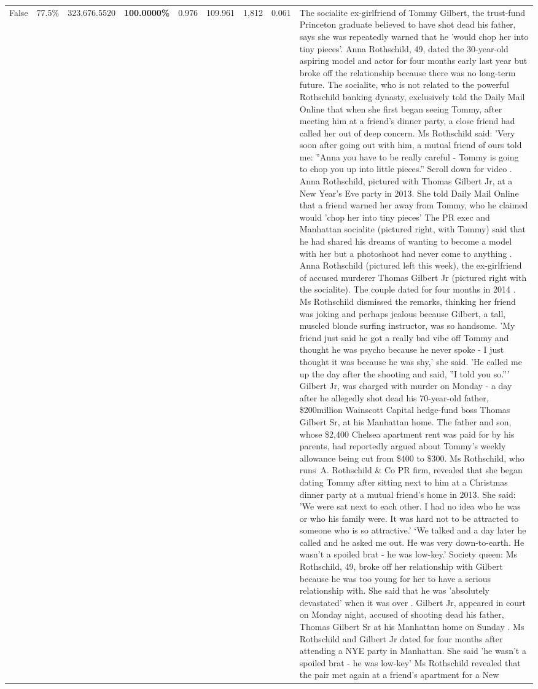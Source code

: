 \begin{table}[H]
\begin{tabular}{lllrlllll}
False & 77.5\% & 323,676.5520 & \bfseries \color{red} 100.0000\% & 0.976 & 109.961 & 1,812 & 0.061 & The socialite ex-girlfriend of Tommy Gilbert, the trust-fund Princeton graduate believed to have shot dead his father, says she was repeatedly warned that he 'would chop her into tiny pieces'. Anna Rothschild, 49, dated the 30-year-old aspiring model and actor for four months early last year but broke off the relationship because there was no long-term future. The socialite, who is not related to the powerful Rothschild banking dynasty, exclusively told the Daily Mail Online that when she first began seeing Tommy, after meeting him at a friend's dinner party, a close friend had called her out of deep concern. Ms Rothschild said: 'Very soon after going out with him, a mutual friend of ours told me: ''Anna you have to be really careful - Tommy is going to chop you up into little pieces.'' Scroll down for video . Anna Rothschild, pictured with Thomas Gilbert Jr, at a New Year's Eve party in 2013. She told Daily Mail Online that a friend warned her away from Tommy, who he claimed would 'chop her into tiny pieces' The PR exec and Manhattan socialite (pictured right, with Tommy) said that he had shared his dreams of wanting to become a model with her but a photoshoot had never come to anything . Anna Rothschild (pictured left this week), the ex-girlfriend of accused murderer Thomas Gilbert Jr (pictured right with the socialite). The couple dated for four months in 2014 . Ms Rothschild dismissed the remarks, thinking her friend was joking and perhaps jealous because Gilbert, a tall, muscled blonde surfing instructor, was so handsome. 'My friend just said he got a really bad vibe off Tommy and thought he was psycho because he never spoke - I just thought it was because he was shy,' she said. 'He called me up the day after the shooting and said, ''I told you so.''' Gilbert Jr, was charged with murder on Monday - a day after he allegedly shot dead his 70-year-old father, \$200million Wainscott Capital hedge-fund boss Thomas Gilbert Sr, at his Manhattan home. The father and son, whose \$2,400 Chelsea apartment rent was paid for by his parents, had reportedly argued about Tommy's weekly allowance being cut from \$400 to \$300. Ms Rothschild, who runs A. Rothschild \& Co PR firm, revealed that she began dating Tommy after sitting next to him at a Christmas dinner party at a mutual friend's home in 2013. She said: 'We were sat next to each other. I had no idea who he was or who his family were. It was hard not to be attracted to someone who is so attractive.' ‘We talked and a day later he called and he asked me out. He was very down-to-earth. He wasn’t a spoiled brat - he was low-key.’ Society queen: Ms Rothschild, 49, broke off her relationship with Gilbert because he was too young for her to have a serious relationship with. She said that he was 'absolutely devastated' when it was over . Gilbert Jr, appeared in court on Monday night, accused of shooting dead his father, Thomas Gilbert Sr at his Manhattan home on Sunday . Ms Rothschild and Gilbert Jr dated for four months after attending a NYE party in Manhattan. She said 'he wasn't a spoiled brat - he was low-key' Ms Rothschild revealed that the pair met again at a friend’s apartment for a New 
\end{tabular}
\end{table}
